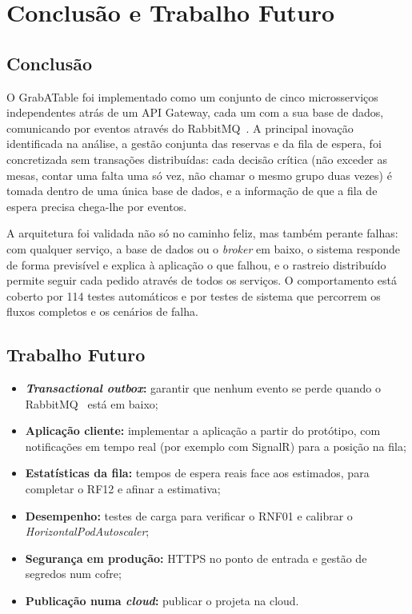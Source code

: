 \chapter{Conclusão e Trabalho Futuro}
\label{cap:conclusao}

\section{Conclusão}

O GrabATable foi implementado como um conjunto de cinco microsserviços independentes atrás de um
API Gateway, cada um com a sua base de dados, comunicando por eventos através do RabbitMQ~\cite{rabbitmq}. A
principal inovação identificada na análise, a gestão conjunta das reservas e da fila de espera, foi
concretizada sem transações distribuídas: cada decisão crítica (não exceder as mesas, contar uma
falta uma só vez, não chamar o mesmo grupo duas vezes) é tomada dentro de uma única base de dados,
e a informação de que a fila de espera precisa chega-lhe por eventos.

A arquitetura foi validada não só no caminho feliz, mas também perante falhas: com qualquer
serviço, a base de dados ou o \textit{broker} em baixo, o sistema responde de forma previsível e
explica à aplicação o que falhou, e o rastreio distribuído permite seguir cada pedido através de
todos os serviços. O comportamento está coberto por 114 testes automáticos e por testes de sistema
que percorrem os fluxos completos e os cenários de falha.

\section{Trabalho Futuro}

\begin{itemize}
  \item \textbf{\textit{Transactional outbox}:} garantir que nenhum evento se perde quando o RabbitMQ~\cite{rabbitmq}
        está em baixo;
  \item \textbf{Aplicação cliente:} implementar a aplicação a partir do protótipo, com notificações
        em tempo real (por exemplo com SignalR) para a posição na fila;
  \item \textbf{Estatísticas da fila:} tempos de espera reais face aos estimados, para completar o
        RF12 e afinar a estimativa;
  \item \textbf{Desempenho:} testes de carga para verificar o RNF01 e calibrar o
        \textit{HorizontalPodAutoscaler};
  \item \textbf{Segurança em produção:} HTTPS no ponto de entrada e gestão de segredos num cofre;
  \item \textbf{Publicação numa \textit{cloud}:} publicar o projeta na cloud.
\end{itemize}
